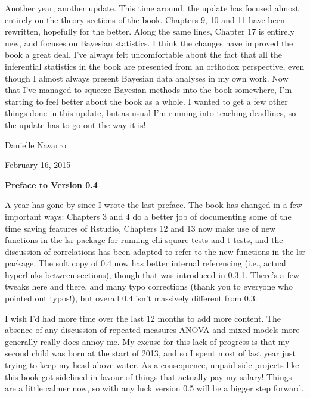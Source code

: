 \noindent
Another year, another update. This time around, the update has focused almost entirely on the theory sections of the book. Chapters 9, 10 and 11 have been rewritten, hopefully for the better. Along the same lines, Chapter 17 is entirely new, and focuses on Bayesian statistics. I think the changes have improved the book a great deal. I've always felt uncomfortable about the fact that all the inferential statistics in the book are presented from an orthodox perspective, even though I almost always present Bayesian data analyses in my own work. Now that I've managed to squeeze Bayesian methods into the book somewhere, I'm starting to feel better about the book as a whole. I wanted to get a few other things done in this update, but as usual I'm running into teaching deadlines, so the update has to go out the way it is!

\vspace*{24pt}
\noindent
Danielle Navarro 

\noindent
February 16, 2015

\vspace*{30pt}

\begin{center}{\Large {\bf Preface to Version 0.4}}\end{center}
\vspace*{12pt}

\noindent
A year has gone by since I wrote the last preface. The book has changed in a few important ways: Chapters 3 and 4 do a better job of documenting some of the time saving features of Rstudio, Chapters 12 and 13 now make use of new functions in the lsr package for running chi-square tests and t tests, and the discussion of correlations has been adapted to refer to the new functions in the lsr package. The soft copy of 0.4 now has better internal referencing (i.e., actual hyperlinks between sections), though that was introduced in 0.3.1. There's a few tweaks here and there, and many typo corrections (thank you to everyone who pointed out typos!), but overall 0.4 isn't massively different from 0.3. 

I wish I'd had more time over the last 12 months to add more content. The absence of any discussion of repeated measures ANOVA and mixed models more generally really does annoy me. My excuse for this lack of progress is that my second child was born at the start of 2013, and so I spent most of last year just trying to keep my head above water. As a consequence, unpaid side projects like this book got sidelined in favour of things that actually pay my salary! Things are a little calmer now, so with any luck version 0.5 will be a bigger step forward.

